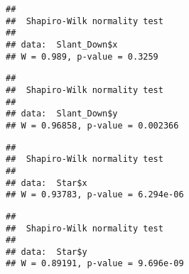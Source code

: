 \documentclass[
]{article}
\newenvironment{Shaded}{\begin{snugshade}}{\end{snugshade}}
\newcommand{\FunctionTok}[1]{\textcolor[rgb]{0.13,0.29,0.53}{\textbf{#1}}}
\newcommand{\NormalTok}[1]{#1}
\newcommand{\OtherTok}[1]{\textcolor[rgb]{0.56,0.35,0.01}{#1}}
\newcommand{\SpecialCharTok}[1]{\textcolor[rgb]{0.81,0.36,0.00}{\textbf{#1}}}
\newcommand{\StringTok}[1]{\textcolor[rgb]{0.31,0.60,0.02}{#1}}
\begin{document}
\begin{verbatim}
## 
##  Shapiro-Wilk normality test
## 
## data:  Slant_Down$x
## W = 0.989, p-value = 0.3259
\end{verbatim}

\begin{Shaded}
\end{Shaded}

\begin{verbatim}
## 
##  Shapiro-Wilk normality test
## 
## data:  Slant_Down$y
## W = 0.96858, p-value = 0.002366
\end{verbatim}

\begin{Shaded}
\end{Shaded}

\begin{verbatim}
## 
##  Shapiro-Wilk normality test
## 
## data:  Star$x
## W = 0.93783, p-value = 6.294e-06
\end{verbatim}

\begin{Shaded}
\end{Shaded}

\begin{verbatim}
## 
##  Shapiro-Wilk normality test
## 
## data:  Star$y
## W = 0.89191, p-value = 9.696e-09
\end{verbatim}

\begin{Shaded}
\end{Shaded}
\end{document}
